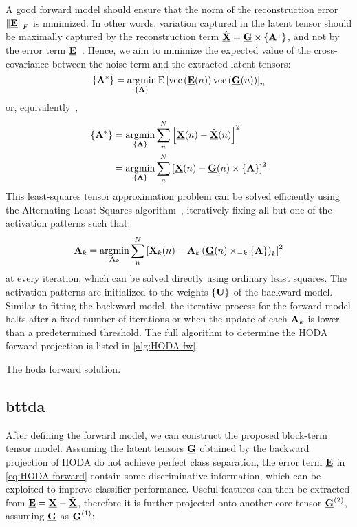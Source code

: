 \documentclass[twocolumn]{article}
\begin{document}
A good forward model should ensure that the norm of the reconstruction error
$\left\|\ten{E}\right\|_F$ is minimized.
In other words, variation captured in the latent tensor should be maximally captured by the
reconstruction term $\hat{\ten{X}}= \ten{G}\mmpr{\mat{A}^\intercal}$, and not by the error term
$\ten{E}$~\cite{Haufe2014}.
Hence, we aim to minimize the expected value of the cross-covariance between
the noise term and the extracted latent tensors:
\begin{equation}
	\left\{\mat{A}^*\right\}
	= \argmin_{\{\mat{A}\}}\text{E}\left[
		\text{vec}\left(\ten{E}(n)\right)\text{vec}\left(\ten{G}(n)\right)
		\right]_n
\end{equation}
or, equivalently~\cite{Parra2005,Haufe2014},
\begin{align}
	\left\{\mat{A}^*\right\}
	 & = \argmin_{\{\mat{A}\}}\sum_n^N\left[\ten{X}(n) -
	\hat{\ten{X}}(n)\right]^2                                                              \\
	 & = \argmin_{\{\mat{A}\}}\sum_n^N\left[\ten{X}(n) - \ten{G}(n)\mmpr{\mat{A}}\right]^2
\end{align}
This least-squares tensor approximation problem can be solved efficiently using the
Alternating Least Squares algorithm~\cite{Bentbib2022}, iteratively fixing all but one of the activation patterns such that:
\begin{equation}
	\mat{A}_k = \argmin_{\mat{A}_k}
	\sum_n^N\left[\mat{X}_k(n) -
		\mat{A}_k\left(\ten{G}(n)\mmprs{\mat{A}}{k}\right)_k\right]^2
\end{equation}
at every iteration, which can be solved directly using ordinary least squares.
The activation patterns are initialized to the weights $\{\mat{U}\}$ of the
backward model.
Similar to fitting the backward model, the iterative process for the forward
model halts after a fixed number of iterations or when the update of each
$\mat{A}_k$ is lower than a predetermined threshold.
The full algorithm to determine the HODA forward projection is listed
in \cref{alg:HODA-fw}.
\begin{algorithm}
	\caption[A \acs{hoda} forward solution.]{The \acs{hoda} forward solution.}
	\label{alg:HODA-fw}
	
\end{algorithm}

\subsection{\Acl{bttda}}
After defining the forward model, we can construct the proposed block-term
tensor model.
Assuming the latent tensors $\ten{G}$ obtained by the backward projection of
HODA do not achieve perfect
class separation, the error term $\ten{E}$ in \cref{eq:HODA-forward} contain
some discriminative information, which can be exploited to improve classifier
performance.
Useful features can then be extracted from $\ten{E} = \ten{X} -
	\hat{\ten{X}}$, therefore it is further projected onto another core tensor
$\ten{G}^{(2)}$, assuming $\ten{G}$ as $\ten{G}^{(1)}$;
\end{document}
